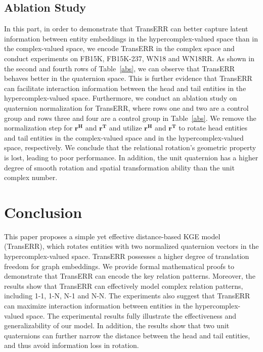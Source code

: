 \documentclass[10pt, a4paper]{article}
\begin{document}
\subsection{Ablation Study}\label{sec6.5}
In this part, in order to demonstrate that TransERR can better capture latent information between entity embeddings in the hypercomplex-valued space than in the complex-valued space, we encode TransERR in the complex space and conduct experiments on FB15K, FB15K-237, WN18 and WN18RR. As shown in the second and fourth rows of Table~\ref{abs},  we can observe that TransERR behaves better in the quaternion space. This is further evidence that TransERR can facilitate interaction information between the head and tail entities in the hypercomplex-valued space. Furthermore, we conduct an ablation study on quaternion normalization for TransERR, where rows one and two are a control group and rows three and four are a control group in Table~\ref{abs}. We remove the normalization step for $\mathbf{r^{H}}$ and $\mathbf{r^{T}}$ and utilize  $\mathbf{r^{H}}$ and $\mathbf{r^{T}}$ to rotate head entities and tail entities in the complex-valued space and in the hypercomplex-valued space, respectively. We conclude that the relational rotation's geometric property is lost, leading to poor performance. In addition, the unit quaternion has a higher degree of smooth rotation and spatial transformation ability than the unit complex number.











\section{Conclusion}
This paper proposes a simple yet effective distance-based KGE model (TransERR), which rotates entities with two normalized quaternion vectors in the hypercomplex-valued space. TransERR possesses a higher degree of translation freedom for graph embeddings. We provide formal mathematical proofs to demonstrate that TransERR can encode the key relation patterns.  Moreover, the results show that TransERR can effectively model complex relation patterns, including 1-1, 1-N, N-1 and N-N. The experiments also suggest that TransERR can maximize interaction information between entities in the hypercomplex-valued space. The experimental results fully illustrate the effectiveness and generalizability of our model. In addition, the results show that two unit quaternions can further narrow the distance between the head and tail entities, and thus avoid information loss in rotation. 
\end{document}
